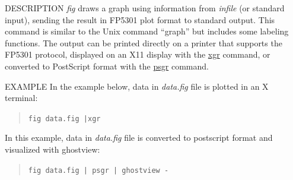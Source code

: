 \begin{synopsis}
 \item[fig] [ --F $F$ ] [ --R $R$ ] [ --W $W$ ] [ --H $H$] [ --o $xo$ $yo$ ]
            [ --g $G$ ]  [ --p $P$ ] [ --j $J$ ]
 \item[\ ~~~] [ --s $S$ ] [ --f $file$ ] [ --t ] [ {\em infile} ]
\end{synopsis}

\begin{qsection}{DESCRIPTION}
{\em fig} draws a graph using information 
from {\em infile} (or standard input), 
sending the result in FP5301 plot format to standard output. 
This command is similar to the Unix command ``graph'' 
but includes some labeling functions. 
The output can be printed directly on a printer 
that supports the FP5301 protocol, 
displayed on an X11 display with the \hyperlink{xgr}{xgr} command, 
or converted to PostScript format with the \hyperlink{psgr}{psgr} command.
\end{qsection}

\begin{options}
\end{options}

\begin{qsection}{EXAMPLE}
In the example below, data in {\em data.fig} file is plotted in an X terminal:
\vspace{-3mm}
\begin{quote}
 \verb!fig data.fig |xgr!
\end{quote}
\vspace{-3mm}
In this example, data in {\em data.fig} file is converted to postscript format
and visualized with ghostview:
\vspace{-3mm}
\begin{quote}
 \verb!fig data.fig | psgr | ghostview -!
\end{quote}
\vspace{-3mm}
\end{qsection}

